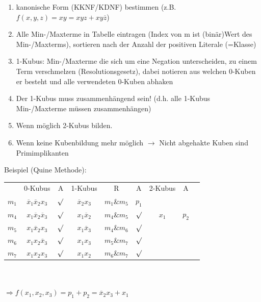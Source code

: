 \documentclass[6pt,a4paper]{scrartcl}
\newcommand{\ol}[1]{\ensuremath{\overline{#1}}}									%
\newcommand{\Ra}[0]{\ensuremath{\Rightarrow}}									%
\newcommand{\ra}[0]{\ensuremath{\rightarrow}} 									%
\begin{document}
\begin{multicols*}{3}
	\begin{enumerate}
		\item kanonische Form (KKNF/KDNF) bestimmen (z.B. $f(x,y,z) = xy = xyz + xy\overline z$)
		\item Alle Min-/Maxterme in Tabelle eintragen (Index von m ist (binär)Wert des Min-/Maxterms), sortieren nach der Anzahl der positiven Literale (=Klasse)
		\item 1-Kubus: Min-/Maxterme die sich um eine Negation unterscheiden, zu einem Term verschmelzen (Resolutionsgesetz), dabei notieren aus welchen 0-Kuben er besteht und alle verwendeten 0-Kuben abhaken
		\item Der 1-Kubus muss zusammenhängend sein! (d.h. alle 1-Kubus Min-/Maxterme müssen zusammenhängen)
		\item Wenn möglich 2-Kubus bilden.
		\item Wenn keine Kubenbildung mehr möglich $\ra$ Nicht abgehakte Kuben sind Primimplikanten
	\end{enumerate}
	Beispiel (Quine Methode):
	
	\begin{tabular}{l | c | c  || c | c | c || c | c | r}
	      & 0-Kubus & A & 1-Kubus & R & A & 2-Kubus  & A \\
	$m_1$ & $\overline x_1 \overline x_2 x_3$ & $\surd$ & $\overline x_2 x_3$ & $m_1 \& m_5$ & $p_1$ & &\\
	$m_4$ & $x_1 \overline x_2 \overline x_3$ & $\surd$ & $x_1 \overline x_2$ & $m_4 \& m_5$ & $\surd$ & $x_1$ &   $p_2$\\
	$m_5$ & $x_1 \overline x_2  x_3$ & $\surd$  & $x_1 \overline x_3$ & $m_4 \& m_6$ & $\surd$& &\\
	$m_6$ & $x_1 x_2 \overline x_3$ & $ \surd$ & $x_1 x_3$ & $ m_5 \& m_7$ & $ \surd$ & &\\
	$m_7$ & $x_1 x_2 x_3$ & $\surd$ & $x_1 x_2$ & $m_6 \& m_7 $ & $ \surd$ & &\\
	\end{tabular} \\ \\
	$\Ra f(x_1,x_2,x_3)=p_1+p_2=\ol x_2x_3 + x_1$
	

\end{multicols*}
\end{document}
